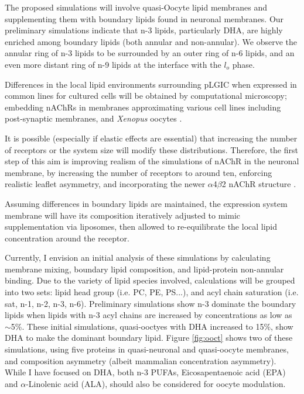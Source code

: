 \documentclass{article}
\begin{document}
The proposed simulations will involve quasi-Oocyte lipid membranes and supplementing them with boundary lipids found in neuronal membranes. Our preliminary simulations indicate that n-3 lipids, particularly DHA, are highly enriched among boundary lipids (both annular and non-annular). We observe the annular ring of n-3 lipids to be surrounded by an outer ring of n-6 lipids, and an even more distant ring of n-9 lipids at the interface with the $l_o$ phase.

Differences in the local lipid environments surrounding pLGIC when expressed in common lines for cultured cells will be obtained by computational microscopy; embedding nAChRs in membranes approximating various cell lines including post-synaptic membranes, and \textit{Xenopus} oocytes \cite{Lindi2001,Gamba2005}. 

It is possible (especially if elastic effects are essential) that increasing the number of receptors or the system size will modify these distributions. Therefore, the first step of this aim is improving realism of the simulations of nAChR in the neuronal membrane, by increasing the number of receptors to around ten, enforcing realistic leaflet asymmetry, and incorporating the newer $\alpha$4$\beta$2 nAChR structure \cite{Morales-Perez_X_2016}. 

Assuming differences in boundary lipids are maintained, the expression system membrane will have its composition iteratively adjusted to mimic supplementation via liposomes, then allowed to re-equilibrate the local lipid concentration around the receptor.

Currently, I envision an initial analysis of these simulations by calculating membrane mixing, boundary lipid composition, and lipid-protein non-annular binding. Due to the variety of lipid species involved, calculations will be grouped into two sets: lipid head group (i.e. PC, PE, PS...), and acyl chain saturation (i.e. sat, n-1, n-2, n-3, n-6). Preliminary simulations show n-3 dominate the boundary lipids when lipids with n-3 acyl chains are increased by concentrations as low as $\sim$5\%. These initial simulations, quasi-ooctyes with DHA increased to 15$\%$, show DHA to make the dominant boundary lipid. Figure \ref{fig:ooct} shows two of these simulations, using five proteins in quasi-neuronal and quasi-oocyte membranes, and composition asymmetry (albeit mammalian concentration asymmetry). While I have focused on DHA, both n-3 PUFAs, Eicosapentaenoic acid (EPA) and $\alpha$-Linolenic acid (ALA), should also be considered for oocyte modulation.
\end{document}

